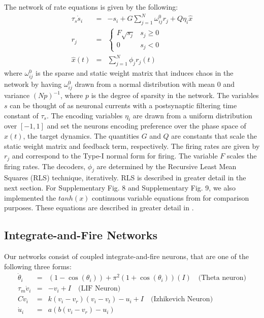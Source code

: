 \documentclass[11pt]{article} %
\begin{document}
The network of rate equations is given by the following:
\begin{eqnarray}
\tau_s\dot{s}_i &=& -s_i + G\sum_{j=1}^N \omega^0_{ij} r_j + Q\eta_i \hat{x}\\
r_j &=& \begin{cases} F \sqrt{s_j} & s_j\geq 0 \\ 0 & s_j <0   \end{cases} \\
\hat{x}(t) &=& \sum_{j=1}^N \phi_j r_j(t) 
\end{eqnarray} 
where $\omega^0_{ij} $ is the sparse and static weight matrix that induces 
chaos in the network by having $\omega^0_{ij}$ drawn from a normal distribution 
with mean 0 and variance $(Np)^{-1}$, where $p$ is the degree of sparsity 
in the network.  The variables $s$ can be thought of as neuronal 
currents with a postsynaptic filtering time constant of $\tau_s$.   
The encoding variables $\eta_i$ are drawn from a uniform distribution 
over $[-1,1]$ and set the neurons encoding preference over the phase space 
of $x(t)$, the target dynamics.  The quantities $G$ and $Q$ are constants 
that scale the static weight matrix and feedback term, respectively.   
The firing rates are given by $r_j$ and correspond to the Type-I normal form for firing.  
The variable $F$ scales the firing rates.    
The decoders, $\phi_j$ are determined by the Recursive Least Mean Squares (RLS) technique, 
iteratively.  RLS is described in greater detail in the next section.  
For Supplementary Fig. 8 and Supplementary Fig. 9, 
we also implemented the $tanh(x)$ continuous variable equations 
from \cite{FORCE1} for comparison purposes.  
These equations are described in greater detail in \cite{FORCE1}.  
 



\subsection*{Integrate-and-Fire Networks} 
Our networks consist of coupled integrate-and-fire neurons, 
that are one of the following three forms: 
\begin{eqnarray}
\dot{\theta}_i &=& (1-\cos(\theta_i)) +\pi^2 (1+\cos(\theta_i))( I)  \quad \text{(Theta neuron)}\\
\tau_m\dot{v}_i &=& -v_i + I  \quad \text{(LIF Neuron)} \\
C\dot{v}_i &=& k(v_i-v_r)(v_i-v_t) - u_i +I  \quad \text{(Izhikevich Neuron)} \\
\dot{u}_i &=& a(b(v_i -v_r) - u_i) 
\end{eqnarray}
\end{document}
